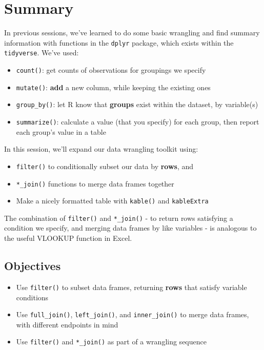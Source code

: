 \documentclass[]{book}
\providecommand{\tightlist}{%
  \setlength{\itemsep}{0pt}\setlength{\parskip}{0pt}}
\begin{document}
\hypertarget{summary-5}{%
\section{Summary}\label{summary-5}}

In previous sessions, we've learned to do some basic wrangling and find summary information with functions in the \texttt{dplyr} package, which exists within the \texttt{tidyverse}. We've used:

\begin{itemize}
\tightlist
\item
  \texttt{count()}: get counts of observations for groupings we specify
\item
  \texttt{mutate()}: \textbf{add} a new column, while keeping the existing ones
\item
  \texttt{group\_by()}: let R know that \textbf{groups} exist within the dataset, by variable(s)
\item
  \texttt{summarize()}: calculate a value (that you specify) for each group, then report each group's value in a table
\end{itemize}

In this session, we'll expand our data wrangling toolkit using:

\begin{itemize}
\tightlist
\item
  \texttt{filter()} to conditionally subset our data by \textbf{rows}, and
\item
  \texttt{*\_join()} functions to merge data frames together
\item
  Make a nicely formatted table with \texttt{kable()} and \texttt{kableExtra}
\end{itemize}

The combination of \texttt{filter()} and \texttt{*\_join()} - to return rows satisfying a condition we specify, and merging data frames by like variables - is analogous to the useful VLOOKUP function in Excel.

\hypertarget{objectives-5}{%
\subsection{Objectives}\label{objectives-5}}

\begin{itemize}
\tightlist
\item
  Use \texttt{filter()} to subset data frames, returning \textbf{rows} that satisfy variable conditions
\item
  Use \texttt{full\_join()}, \texttt{left\_join()}, and \texttt{inner\_join()} to merge data frames, with different endpoints in mind
\item
  Use \texttt{filter()} and \texttt{*\_join()} as part of a wrangling sequence
\end{itemize}
\end{document}
